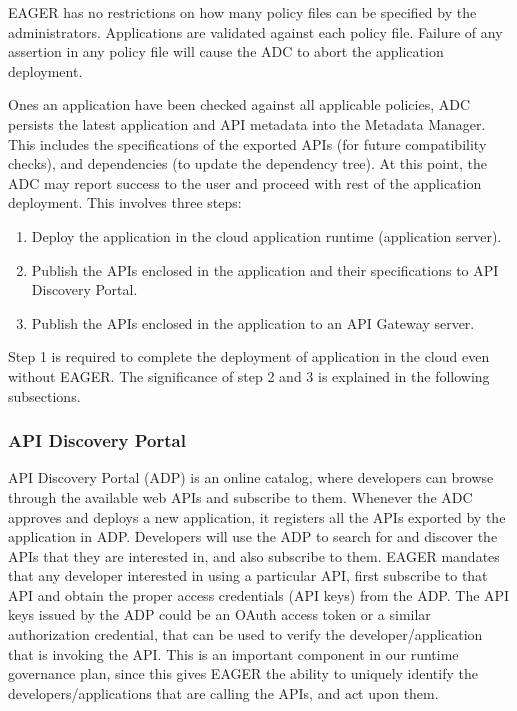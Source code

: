 EAGER has no restrictions on how many policy files can be specified by the administrators. Applications are validated against each policy file. Failure of 
any assertion in any policy file will cause the ADC to abort the application deployment.

Ones an application have been checked against all applicable policies, ADC persists the latest application and API metadata into the Metadata Manager.
This includes the specifications of the exported APIs (for future compatibility checks), and dependencies (to update the dependency tree). At this point, the ADC
may report success to the user and proceed with rest of the application deployment. This involves three steps:

\begin{enumerate}
\item Deploy the application in the cloud application runtime (application server).
\item Publish the APIs enclosed in the application and their specifications to API Discovery Portal.
\item Publish the APIs enclosed in the application to an API Gateway server.
\end{enumerate}

Step 1 is required to complete the deployment of application in the cloud even without EAGER. The significance of step 2 and 3 is explained in the 
following subsections.

\subsubsection{API Discovery Portal}
API Discovery Portal (ADP) is an online catalog, where developers can browse through the available web APIs and subscribe to them. Whenever the ADC
approves and deploys a new application, it registers all the APIs exported by the application in ADP. Developers will use the ADP to search for and discover
the APIs that they are interested in, and also subscribe to them. EAGER mandates that any developer interested in using a particular API, first subscribe to that
API and obtain the proper access credentials (API keys) from the ADP. The API keys issued by the ADP could be an OAuth access token or a similar authorization
credential, that can be used to verify the developer/application that is invoking the API. This is an important component in our runtime governance
plan, since this gives EAGER the ability to uniquely identify the developers/applications that are calling the APIs, and act upon them. 

